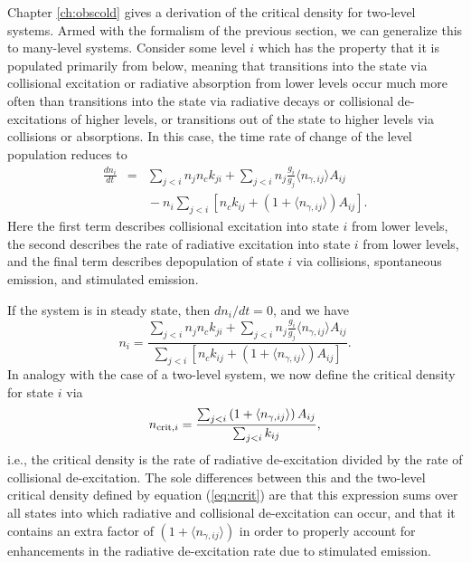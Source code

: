 Chapter \ref{ch:obscold} gives a derivation of the critical density for two-level systems. Armed with the formalism of the previous section, we can generalize this to many-level systems. Consider some level $i$ which has the property that it is populated primarily from below, meaning that transitions into the state via collisional excitation or radiative absorption from lower levels occur much more often than transitions into the state via radiative decays or collisional de-excitations of higher levels, or transitions out of the state to higher levels via collisions or absorptions. In this case, the time rate of change of the level population reduces to
\begin{eqnarray}
\frac{dn_i}{dt} & = & \sum_{j<i} n_j n_c k_{ji} + \sum_{j<i} n_j \frac{g_i}{g_j} \langle n_{\gamma,ij}\rangle A_{ij}
\nonumber \\
& & {} - n_i \sum_{j<i} \left[n_c k_{ij} + \left(1+\langle n_{\gamma,ij}\rangle\right)A_{ij}\right].
\end{eqnarray}
Here the first term describes collisional excitation into state $i$ from lower levels, the second describes the rate of radiative excitation into state $i$ from lower levels, and the final term describes depopulation of state $i$ via collisions, spontaneous emission, and stimulated emission.

If the system is in steady state, then $dn_i/dt = 0$, and we have
\begin{equation}
\label{eq:nsteady}
n_i = \frac{\sum_{j<i} n_j n_c k_{ji} + \sum_{j<i} n_j \frac{g_i}{g_j} \langle n_{\gamma,ij}\rangle A_{ij}}{\sum_{j<i} \left[n_c k_{ij} + \left(1 + \langle n_{\gamma,ij}\rangle\right)A_{ij}\right]}.
\end{equation}
In analogy with the case of a two-level system, we now define the critical density for state $i$ via
\begin{equation}
n_{{\rm crit},i} = \frac{\sum_{j<i} \left(1 + \langle n_{\gamma,ij}\rangle\right) A_{ij}}{\sum_{j<i} k_{ij}},
\end{equation}
i.e., the critical density is the rate of radiative de-excitation divided by the rate of collisional de-excitation. The sole differences between this and the two-level critical density defined by equation (\ref{eq:ncrit}) are that this expression sums over all states into which radiative and collisional de-excitation can occur, and that it contains an extra factor of $ \left(1 + \langle n_{\gamma,ij}\rangle\right)$ in order to properly account for enhancements in the radiative de-excitation rate due to stimulated emission.

